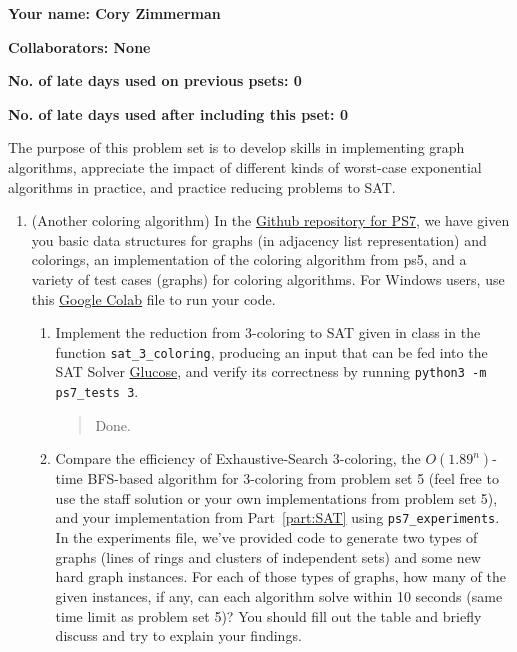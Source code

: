 \documentclass[11pt]{article}
\begin{document}

\textbf{Your name: Cory Zimmerman}

\textbf{Collaborators: None}

\textbf{No. of late days used on previous psets: 0}

\textbf{No. of late days used after including this pset: 0}


The purpose of this problem set is to develop skills in implementing graph algorithms, appreciate the impact of different kinds of worst-case exponential algorithms in practice, and practice reducing problems to SAT.
\begin{enumerate}

    \item (Another coloring algorithm) 
  In the \href{https://github.com/Harvard-CS-120/cs120/tree/main/fall2023/psets/ps7}{Github repository for PS7}, we have given you basic data structures for graphs (in adjacency list representation) and colorings, an implementation of the coloring algorithm from ps5, and a variety of test cases (graphs) for coloring algorithms. For Windows users, use this \href{https://colab.research.google.com/drive/13nMhNMaDstVaEkxye61m8AV7nk9ks9uS#scrollTo=AbIalcylVVuu}{Google Colab} file to run your code.
  
  \begin{enumerate}
      
      \item Implement the reduction from 3-coloring to SAT given in class in the function \texttt{sat\_3\_coloring}, producing an input that can be fed into the SAT Solver \href{https://pysathq.github.io/usage/}{Glucose}, and verify its correctness by running \texttt{python3 -m ps7\_tests 3}. \label{part:SAT}
      \begin{quote}
          \color{purple}
          Done.
      \end{quote}

      \item Compare the efficiency of Exhaustive-Search 3-coloring, the $O(1.89^n)$-time BFS-based algorithm for 3-coloring from problem set 5 (feel free to use the staff solution or your own implementations from problem set 5), and your implementation from  Part~\ref{part:SAT} using \texttt{ps7\_experiments}. In the experiments file, we've provided code to generate two types of graphs (lines of rings and clusters of independent sets) and some new hard graph instances. For each of those types of graphs, how many of the given instances, if any, can each algorithm solve within 10 seconds (same time limit as problem set 5)? You should fill out the table and briefly discuss and try to explain your findings.


\end{enumerate}
\end{enumerate}
\end{document}
